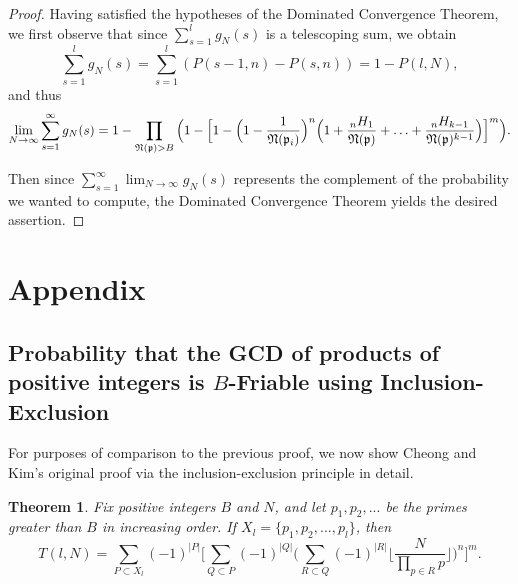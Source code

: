\documentclass[12pt]{amsart}
\newtheorem{theorem}{Theorem}[subsection]
\theoremstyle{definition}
\newcommand{\f}[1]{\mathfrak{#1}}
\begin{document}
\begin{proof}
Having satisfied the hypotheses of the Dominated Convergence Theorem, we first observe that since $\sum_{s=1}^l g_N(s)$ is a telescoping sum, we obtain
$$\sum_{s=1}^l g_N(s) = \sum_{s=1}^l (P(s-1, n) - P(s, n)) = 1 - P(l, N),$$ 
and thus
$$\lim_{N \to \infty} \sum_{s=1}^{\infty} g_N(s) = 1 - \prod_{\f{N}(\f{p}) > B} \Big(1 - \Big[1 - \Big(1-\frac{1}{\f{N}(\f{p}_i)}\Big)^n \Big(1 + \frac{{}_nH_1}{\f{N}(\f{p})} + \mathellipsis + \frac{{}_nH_{k-1}}{\f{N}(\f{p})^{k-1}}\Big)\Big]^m\Big).$$

\noindent Then since $\displaystyle \sum_{s=1}^{\infty} \lim_{N \to \infty} g_N(s)$ represents the complement of the probability we wanted to compute, the Dominated Convergence Theorem yields the desired assertion.
\end{proof}

\section{Appendix}
\subsection{Probability that the GCD of products of positive integers is $B$-Friable using Inclusion-Exclusion}
For purposes of comparison to the previous proof, we now show Cheong and Kim's original proof via the inclusion-exclusion principle in detail.
\begin{theorem}
	Fix positive integers $B$ and $N$, and let $p_1, p_2, ...$ be the primes greater than $B$ in increasing order. If $X_l = \{p_1, p_2, ..., p_l\}$, then
	$$T(l,N)=\sum_{P\subset X_l}{(-1)^{|P|}} \Big[\sum_{Q\subset P}(-1)^{|Q|} \Big(\sum_{R\subset Q}(-1)^{|R|}\Big\lfloor\frac{N}{\prod_{p\in R} p}\Big\rfloor\Big)^n\Big]^m.$$
\end{theorem}
\end{document}
